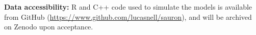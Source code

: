 \documentclass[12pt]{article}
\begin{document}
\textbf{Data accessibility:} R and C++ code used to simulate the models
is available from GitHub (\url{https://www.github.com/lucasnell/sauron}),
and will be archived on Zenodo upon acceptance.



\clearpage


\doublespacing








\clearpage






















\end{document}
